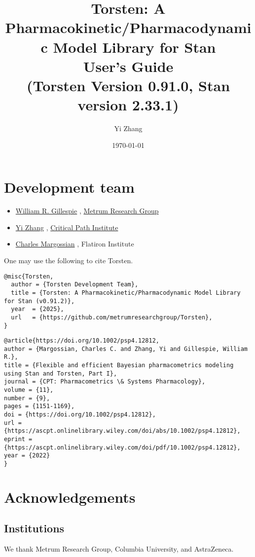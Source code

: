 \documentclass[12pt, reqno, oneside]{amsbook}
\author{Yi Zhang}
\date{\today}
\title{Torsten: A Pharmacokinetic/Pharmacodynamic Model Library for Stan\\\medskip
\large User's Guide \\  (Torsten Version 0.91.0, Stan version 2.33.1)}
\numberwithin{equation}{chapter}
\numberwithin{figure}{chapter}
\numberwithin{table}{chapter}
\theoremstyle{remark}
\begin{document}
\maketitle
\tableofcontents


\chapter*{Development team}
\label{sec:org5ae31e5}
\begin{itemize}
\item \href{mailto:billg@metrumrg.com}{William R. Gillespie} , \href{https://www.metrumrg.com/}{Metrum Research Group}
\item \href{mailto:yz@yizh.org}{Yi Zhang} , \href{https://www.c-path.org/}{Critical Path Institute}
\item \href{mailto:cmargossian@flatironinstitute.org}{Charles Margossian} , Flatiron Institute
\end{itemize}

\vspace{1in}

One may use the following to cite Torsten.
\begin{verbatim}
@misc{Torsten,
  author = {Torsten Development Team},
  title = {Torsten: A Pharmacokinetic/Pharmacodynamic Model Library for Stan (v0.91.2)},
  year  = {2025},
  url   = {https://github.com/metrumresearchgroup/Torsten},
}
\end{verbatim}

\begin{verbatim}
@article{https://doi.org/10.1002/psp4.12812,
author = {Margossian, Charles C. and Zhang, Yi and Gillespie, William R.},
title = {Flexible and efficient Bayesian pharmacometrics modeling using Stan and Torsten, Part I},
journal = {CPT: Pharmacometrics \& Systems Pharmacology},
volume = {11},
number = {9},
pages = {1151-1169},
doi = {https://doi.org/10.1002/psp4.12812},
url = {https://ascpt.onlinelibrary.wiley.com/doi/abs/10.1002/psp4.12812},
eprint = {https://ascpt.onlinelibrary.wiley.com/doi/pdf/10.1002/psp4.12812},
year = {2022}
}
\end{verbatim}

\chapter*{Acknowledgements}
\label{sec:orgab46cef}
\section*{Institutions}
\label{sec:orgb690148}
We thank Metrum Research Group, Columbia University, and AstraZeneca.
\end{document}

